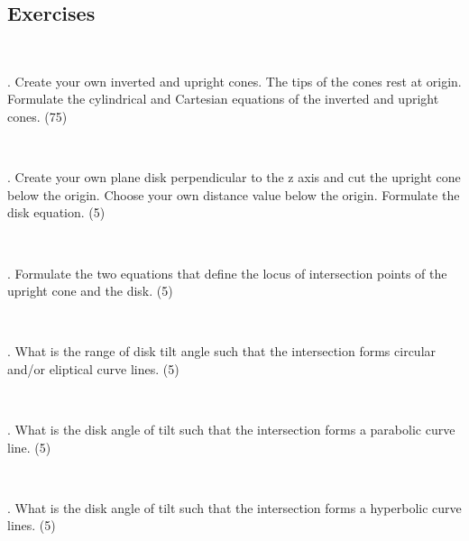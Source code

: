 \documentclass[10pt,a4paper,leqno]{article}
\begin{document}
\begin{CJK*}{UTF8}{gbsn}
\noindent \section{Exercises}
 \par \ \par{}. Create your own inverted and upright cones. The tips of the cones rest at origin. Formulate the cylindrical and Cartesian equations of the inverted and upright cones. (75)
 \par \ \par{}. Create your own plane disk perpendicular to the z axis and cut the upright cone below the origin. Choose your own distance value below the origin. Formulate the disk equation. (5) 
 \par \ \par{}. Formulate the two equations that define the locus of intersection points of the upright cone and the disk. (5)
 \par \ \par{}. What is the range of disk tilt angle such that the intersection forms circular and/or eliptical curve lines. (5) 
 \par \ \par{}. What is the disk angle of tilt such that the intersection forms a parabolic curve line. (5)
 \par \ \par{}. What is the disk angle of tilt such that the intersection forms a hyperbolic curve lines. (5)
 \par \ \par\noindent \nocite{2}
 \par \ \par\noindent \nocite{3}
 \par \ \par\noindent \nocite{7}
 \par \ \par\noindent \nocite{8}
 \par \ \par\noindent \nocite{9}
 \par \ \par\noindent \nocite{11}
 \par \ \par\noindent \nocite{13}
 \par \ \par\noindent \nocite{15}
 \par \ \par\noindent \nocite{202}
 \par \ \par\noindent \nocite{203}
 \par \ \par\noindent  
 
 \par \ \par\noindent \end{CJK*}
 \par \ \par
\end{document}
